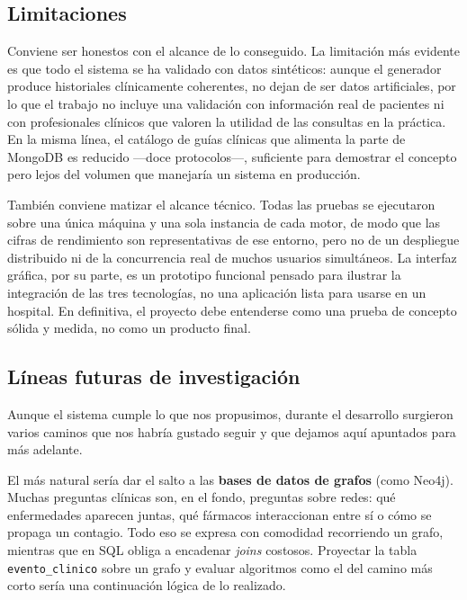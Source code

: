 \documentclass[../main.tex]{subfiles}
\begin{document}
\subsection{Limitaciones}

Conviene ser honestos con el alcance de lo conseguido. La limitación más evidente es que todo el sistema se ha validado con datos sintéticos: aunque el generador produce historiales clínicamente coherentes, no dejan de ser datos artificiales, por lo que el trabajo no incluye una validación con información real de pacientes ni con profesionales clínicos que valoren la utilidad de las consultas en la práctica. En la misma línea, el catálogo de guías clínicas que alimenta la parte de MongoDB es reducido ---doce protocolos---, suficiente para demostrar el concepto pero lejos del volumen que manejaría un sistema en producción.

También conviene matizar el alcance técnico. Todas las pruebas se ejecutaron sobre una única máquina y una sola instancia de cada motor, de modo que las cifras de rendimiento son representativas de ese entorno, pero no de un despliegue distribuido ni de la concurrencia real de muchos usuarios simultáneos. La interfaz gráfica, por su parte, es un prototipo funcional pensado para ilustrar la integración de las tres tecnologías, no una aplicación lista para usarse en un hospital. En definitiva, el proyecto debe entenderse como una prueba de concepto sólida y medida, no como un producto final.

\subsection{Líneas futuras de investigación}

Aunque el sistema cumple lo que nos propusimos, durante el desarrollo surgieron varios caminos que nos habría gustado seguir y que dejamos aquí apuntados para más adelante.

El más natural sería dar el salto a las \textbf{bases de datos de grafos} (como Neo4j). Muchas preguntas clínicas son, en el fondo, preguntas sobre redes: qué enfermedades aparecen juntas, qué fármacos interaccionan entre sí o cómo se propaga un contagio. Todo eso se expresa con comodidad recorriendo un grafo, mientras que en SQL obliga a encadenar \textit{joins} costosos. Proyectar la tabla \texttt{evento\_clinico} sobre un grafo y evaluar algoritmos como el del camino más corto sería una continuación lógica de lo realizado.
\end{document}
